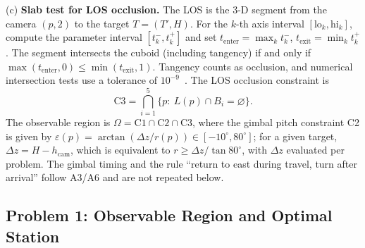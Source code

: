 \noindent (c) \textbf{Slab test for LOS occlusion.} The LOS is the 3-D segment from the camera $(p,2)$ to the target $T=(T',H)$. For the $k$-th axis interval $[\mathrm{lo}_k,\mathrm{hi}_k]$, compute the parameter interval $[t_k^-,t_k^+]$ and set $t_{\mathrm{enter}}=\max_k t_k^-$, $t_{\mathrm{exit}}=\min_k t_k^+$. The segment intersects the cuboid (including tangency) if and only if $\max(t_{\mathrm{enter}},0)\le\min(t_{\mathrm{exit}},1)$. Tangency counts as occlusion, and numerical intersection tests use a tolerance of $10^{-9}$~\cite{preparata}. The LOS occlusion constraint is
\begin{equation}
  \mathrm{C3}=\bigcap_{i=1}^{5}\{p:\ L(p)\cap B_i=\varnothing\}.
\end{equation}
The observable region is $\Omega=\mathrm{C1}\cap\mathrm{C2}\cap\mathrm{C3}$, where the gimbal pitch constraint C2 is given by $\varepsilon(p)=\arctan(\Delta z/r(p))\in[-10^\circ,80^\circ]$; for a given target, $\Delta z=H-h_{\mathrm{cam}}$, which is equivalent to $r\ge\Delta z/\tan80^\circ$, with $\Delta z$ evaluated per problem. The gimbal timing and the rule ``return to east during travel, turn after arrival'' follow A3/A6 and are not repeated below.

\subsection{Problem 1: Observable Region and Optimal Station}
\label{sec:q1}

